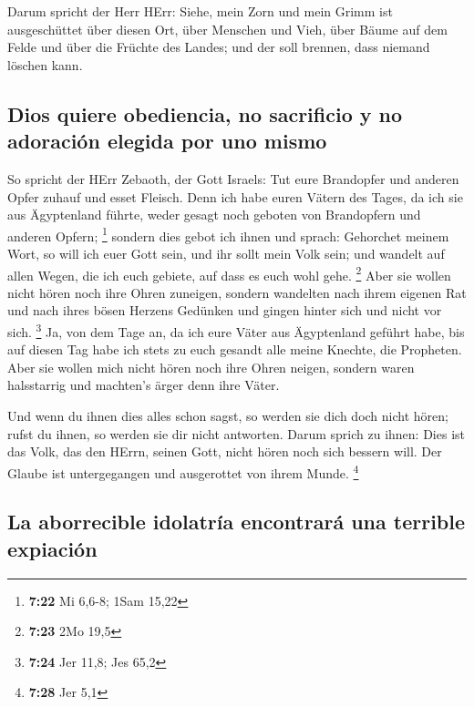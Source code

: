  Darum spricht der Herr HErr: Siehe, mein Zorn und mein
Grimm ist ausgeschüttet über diesen Ort, über Menschen und Vieh, über
Bäume auf dem Felde und über die Früchte des Landes; und der soll
brennen, dass niemand löschen kann.

\hypertarget{dios-quiere-obediencia-no-sacrificio-y-no-adoraciuxf3n-elegida-por-uno-mismo}{%
\subsection{Dios quiere obediencia, no sacrificio y no adoración elegida
por uno
mismo}\label{dios-quiere-obediencia-no-sacrificio-y-no-adoraciuxf3n-elegida-por-uno-mismo}}

 So spricht der HErr Zebaoth, der Gott Israels: Tut eure
Brandopfer und anderen Opfer zuhauf und esset Fleisch. 
Denn ich habe euren Vätern des Tages, da ich sie aus Ägyptenland führte,
weder gesagt noch geboten von Brandopfern und anderen Opfern;
\footnote{\textbf{7:22} Mi 6,6-8; 1Sam 15,22}  sondern
dies gebot ich ihnen und sprach: Gehorchet meinem Wort, so will ich euer
Gott sein, und ihr sollt mein Volk sein; und wandelt auf allen Wegen,
die ich euch gebiete, auf dass es euch wohl gehe. \footnote{\textbf{7:23}
  2Mo 19,5}  Aber sie wollen nicht hören noch ihre Ohren
zuneigen, sondern wandelten nach ihrem eigenen Rat und nach ihres bösen
Herzens Gedünken und gingen hinter sich und nicht vor sich. \footnote{\textbf{7:24}
  Jer 11,8; Jes 65,2}  Ja, von dem Tage an, da ich eure
Väter aus Ägyptenland geführt habe, bis auf diesen Tag habe ich stets zu
euch gesandt alle meine Knechte, die Propheten.  Aber sie
wollen mich nicht hören noch ihre Ohren neigen, sondern waren
halsstarrig und machten's ärger denn ihre Väter.

 Und wenn du ihnen dies alles schon sagst, so werden sie
dich doch nicht hören; rufst du ihnen, so werden sie dir nicht
antworten.  Darum sprich zu ihnen: Dies ist das Volk, das
den HErrn, seinen Gott, nicht hören noch sich bessern will. Der Glaube
ist untergegangen und ausgerottet von ihrem Munde. \footnote{\textbf{7:28}
  Jer 5,1}

\hypertarget{la-aborrecible-idolatruxeda-encontraruxe1-una-terrible-expiaciuxf3n}{%
\subsection{La aborrecible idolatría encontrará una terrible
expiación}\label{la-aborrecible-idolatruxeda-encontraruxe1-una-terrible-expiaciuxf3n}}

